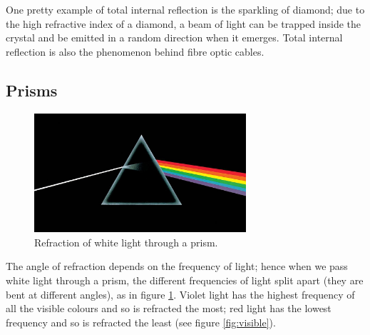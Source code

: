 \documentclass[a4paper]{amsbook}
\newcommand\capcite[1]{}
\begin{document}
One pretty example of total internal reflection is the sparkling of diamond; due to the high refractive index of a diamond,
a beam of light can be trapped inside the crystal and be emitted in a random direction when it emerges. Total internal reflection
is also the phenomenon behind fibre optic cables.

\subsection{Prisms}
\begin{figure}
  \centering
  \includegraphics[width=0.7\textwidth]{prism}
  \caption{Refraction of white light through a prism. \capcite{https://www.jambase.com/wp-content/uploads/2016/03/DSOTM-Crop-1480x832.jpg}\label{fig:prism}}
\end{figure}
The angle of refraction depends on the frequency of light; hence when we pass white light through a prism, the different frequencies
of light split apart (they are bent at different angles), as in figure \ref{fig:prism}. Violet light has the highest frequency of all the visible
colours and so is refracted the most; red light has the lowest frequency and so is refracted the least (see figure \ref{fig:visible}).
\end{document}
